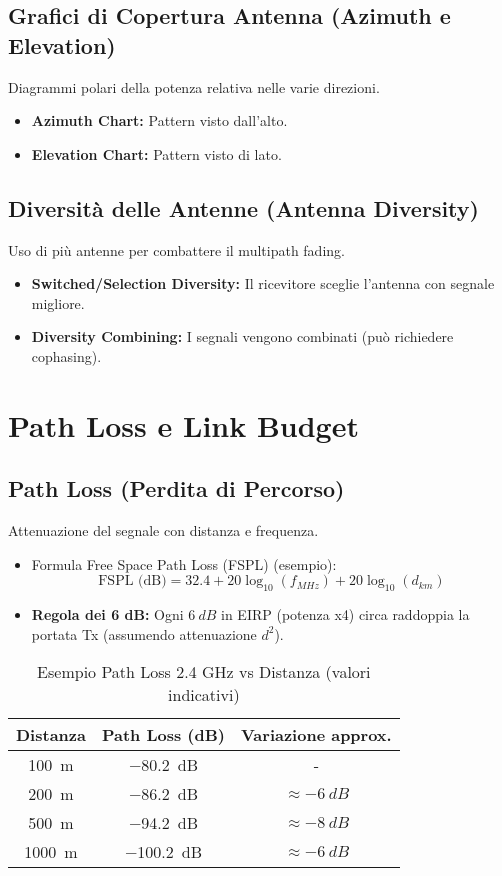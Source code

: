 \subsection{Grafici di Copertura Antenna (Azimuth e Elevation)}
Diagrammi polari della potenza relativa nelle varie direzioni.
\begin{itemize}
    \item \textbf{Azimuth Chart:} Pattern visto dall'alto.
    \item \textbf{Elevation Chart:} Pattern visto di lato.
\end{itemize}

\subsection{Diversità delle Antenne (Antenna Diversity)}
Uso di più antenne per combattere il multipath fading.
\begin{itemize}
    \item \textbf{Switched/Selection Diversity:} Il ricevitore sceglie l'antenna con segnale migliore.
    \item \textbf{Diversity Combining:} I segnali vengono combinati (può richiedere cophasing).
\end{itemize}

\section{Path Loss e Link Budget}

\subsection{Path Loss (Perdita di Percorso)}
Attenuazione del segnale con distanza e frequenza.
\begin{itemize}
    \item Formula Free Space Path Loss (FSPL) (esempio):
    \[ \text{FSPL (dB)} = 32.4 + 20 \log_{10}(f_{MHz}) + 20 \log_{10}(d_{km}) \]
    \item \textbf{Regola dei 6 dB:} Ogni $\SI{+6}{dB}$ in EIRP (potenza x4) circa raddoppia la portata Tx (assumendo attenuazione $d^2$).
\end{itemize}
\begin{table}[H]
\centering
\caption{Esempio Path Loss 2.4 GHz vs Distanza (valori indicativi)}
\begin{tabular}{|c|c|c|}
\hline
\textbf{Distanza} & \textbf{Path Loss (dB)} & \textbf{Variazione approx.} \\ \hline
\SI{100}{\meter} & \SI{-80.2}{dB} & - \\ \hline
\SI{200}{\meter} & \SI{-86.2}{dB} & $\approx \SI{-6}{dB}$ \\ \hline
\SI{500}{\meter} & \SI{-94.2}{dB} & $\approx \SI{-8}{dB}$ \\ \hline
\SI{1000}{\meter} & \SI{-100.2}{dB} & $\approx \SI{-6}{dB}$ \\ \hline
\end{tabular}
\label{tab:path_loss}
\end{table}

